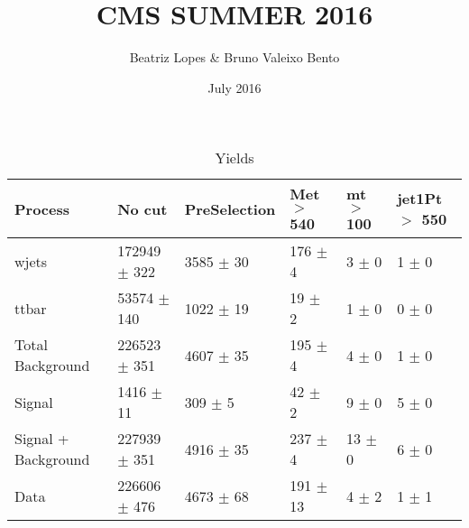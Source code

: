 \documentclass{article}
\title{CMS SUMMER 2016}
\author{Beatriz Lopes &  Bruno Valeixo Bento}
\date{July 2016}
\begin{document}
\maketitle
\begin{table}[!h]
\centering
\begin{tabular}{llllll}
\hline
Process & No cut& PreSelection& Met $>$ 540& mt $>$ 100& jet1Pt $>$ 550\\
\hline
wjets & 172949 $\pm$ 322 & 3585 $\pm$ 30 & 176 $\pm$ 4 & 3 $\pm$ 0 & 1 $\pm$ 0 \\
ttbar & 53574 $\pm$ 140 & 1022 $\pm$ 19 & 19 $\pm$ 2 & 1 $\pm$ 0 & 0 $\pm$ 0 \\
Total Background & 226523 $\pm$ 351 & 4607 $\pm$ 35 & 195 $\pm$ 4 & 4 $\pm$ 0 & 1 $\pm$ 0 \\
\hline
Signal & 1416 $\pm$ 11 & 309 $\pm$ 5 & 42 $\pm$ 2 & 9 $\pm$ 0 & 5 $\pm$ 0 \\
\hline
Signal + Background & 227939 $\pm$ 351 & 4916 $\pm$ 35 & 237 $\pm$ 4 & 13 $\pm$ 0 & 6 $\pm$ 0 \\
\hline
\hline
Data & 226606 $\pm$ 476 & 4673 $\pm$ 68 & 191 $\pm$ 13 & 4 $\pm$ 2 & 1 $\pm$ 1 \\
\hline
\end{tabular}
\caption{Yields}
\end{table}
\end{document}
